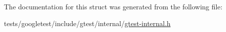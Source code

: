 The documentation for this struct was generated from the following file\+:\begin{DoxyCompactItemize}
\item 
tests/googletest/include/gtest/internal/\hyperlink{gtest-internal_8h}{gtest-\/internal.\+h}\end{DoxyCompactItemize}
